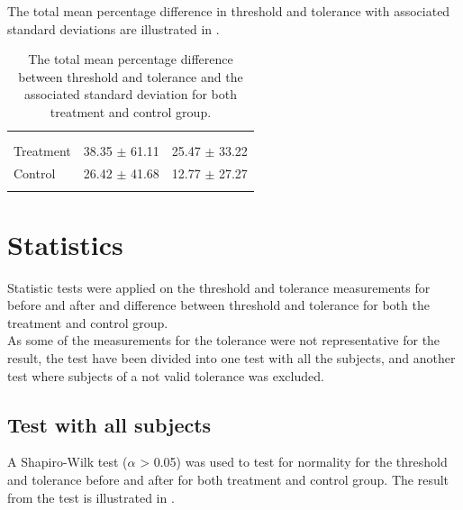 The total mean percentage difference in threshold and tolerance with associated standard deviations are illustrated in . 

\begin{longtable} {l|c|c}
 \rowcolor[HTML]{C0C0C0} 
  \color[HTML]{000000}{} & 
\color[HTML]{000000}{\textbf{Threshold}} & \color[HTML]{000000}{\textbf{Tolerance}} 	\\  \rule{0pt}{3ex} 
\cellcolor[HTML]{C0C0C0}{} &
 \cellcolor[HTML]{C0C0C0}{Difference [\%]} &  \cellcolor[HTML]{C0C0C0}{Difference [\%]} \\ \hline
Treatment & 38.35 $\pm$ 61.11 & 25.47 $\pm$ 33.22 \\ \hline
Control & 26.42 $\pm$ 41.68 & 12.77 $\pm$ 27.27 \\ \hline
	\caption{The total mean percentage difference between threshold and tolerance and the associated standard deviation for both treatment and control group.}
	\label{tab:Total}
\end{longtable}
\vspace{-.5cm}


\section{Statistics}
Statistic tests were applied on the threshold and tolerance measurements for before and after and difference between threshold and tolerance for both the treatment and control group.\\

As some of the measurements for the tolerance were not representative for the result, the test have been divided into one test with all the subjects, and another test where subjects of a not valid tolerance was excluded.

\subsection{Test with all subjects}
A Shapiro-Wilk test ($\alpha$ > 0.05) was used to test for normality for the threshold and tolerance before and after for both treatment and control group. The result from the test is illustrated in .

